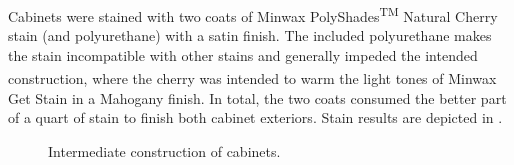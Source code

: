 %
Cabinets were stained with two coats of Minwax\textsuperscript{\textregistered} PolyShades\textsuperscript{TM} Natural Cherry stain (and polyurethane) with a satin finish. The included polyurethane makes the stain incompatible with other stains and generally impeded the intended construction, where the cherry was intended to warm the light tones of Minwax\textsuperscript{\textregistered} Get Stain in a Mahogany finish. In total, the two coats consumed the better part of a quart of stain to finish both cabinet exteriors. Stain results are depicted in .\par
%
\begin{figure}[h!]
\centering
{}
\qquad
{}
\caption{Intermediate construction of cabinets.}
\label{fig:sp_stain}
\end{figure}
